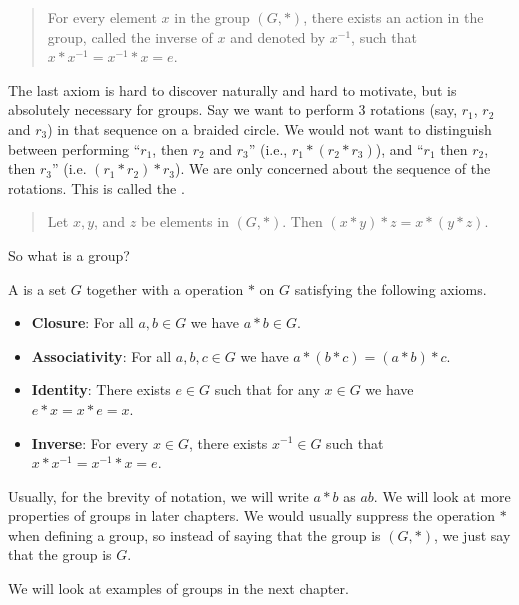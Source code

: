\begin{quote}
    For every element $x$ in the group $(G, \ast)$, there exists an action in the group, called the inverse of $x$ and denoted by $x^{-1}$, such that $x \ast x^{-1} = x^{-1} \ast x = e$.
\end{quote}

The last axiom is hard to discover naturally and hard to motivate, but is absolutely necessary for groups. Say we want to perform 3 rotations (say, $r_1$, $r_2$ and $r_3$) in that sequence on a braided circle. We would not want to distinguish between performing ``$r_1$, then $r_2$ and $r_3$'' (i.e., $r_1 \ast (r_2 \ast r_3)$), and ``$r_1$ then $r_2$, then $r_3$'' (i.e. $(r_1 \ast r_2) \ast r_3$). We are only concerned about the sequence of the rotations. This is called the .
\begin{quote}
    Let $x, y$, and $z$ be elements in $(G, \ast)$. Then $(x \ast y) \ast z = x \ast (y \ast z)$.
\end{quote}

So what is a group?
\begin{definition}
    A  is a set $G$ together with a operation $\ast$ on $G$ satisfying the following axioms.
    \begin{itemize}
        \item \textbf{Closure}: For all $a, b \in G$ we have $a \ast b \in G$.
        \item \textbf{Associativity}: For all $a, b, c \in G$ we have $a \ast (b \ast c) = (a \ast b) \ast c$.
        \item \textbf{Identity}: There exists $e \in G$ such that for any $x \in G$ we have $e \ast x = x \ast e = x$.
        \item \textbf{Inverse}: For every $x \in G$, there exists $x^{-1} \in G$ such that $x \ast x^{-1} = x^{-1} \ast x = e$.
    \end{itemize}
\end{definition}

Usually, for the brevity of notation, we will write $a \ast b$ as $ab$. We will look at more properties of groups in later chapters. We would usually suppress the operation $\ast$ when defining a group, so instead of saying that the group is $(G, \ast)$, we just say that the group is $G$.

We will look at examples of groups in the next chapter.

